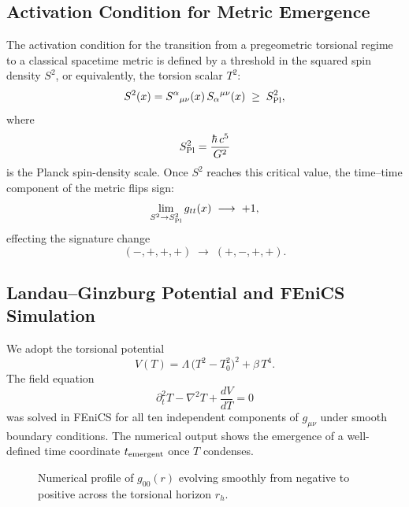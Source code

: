 \documentclass{article}
\begin{document}
\subsection{Activation Condition for Metric Emergence}
The activation condition for the transition from a pregeometric torsional regime to a classical spacetime metric is defined by a threshold in the squared spin density \(S^2\), or equivalently, the torsion scalar \(T^2\):
\[
  S^2(x) = S^\alpha{}_{\mu\nu}(x)\,S_\alpha{}^{\mu\nu}(x)
  \;\ge\; S_{\rm Pl}^2,
\]
where 
\[
  S_{\rm Pl}^2 = \frac{\hbar\,c^5}{G^2}
\]
is the Planck spin-density scale.  Once \(S^2\) reaches this critical value, the time–time component of the metric flips sign:
\[
  \lim_{S^2\to S_{\rm Pl}^2} g_{tt}(x)\;\longrightarrow\;+1,
\]
effecting the signature change
\[
  (-,+,+,+)\;\longrightarrow\;(+,-,+,+).
\]

\subsection{Landau–Ginzburg Potential and FEniCS Simulation}
We adopt the torsional potential
\[
  V(T) = \Lambda\,\bigl(T^2 - T_0^2\bigr)^2 + \beta\,T^4.
\]
The field equation
\[
  \partial_t^2 T - \nabla^2T + \frac{dV}{dT} = 0
\]
was solved in FEniCS for all ten independent components of \(g_{\mu\nu}\) under smooth boundary conditions.  The numerical output shows the emergence of a well-defined time coordinate \(t_{\rm emergent}\) once \(T\) condenses.

\begin{figure}[h]
  \centering
  \caption{Numerical profile of \(g_{00}(r)\) evolving smoothly from negative to positive across the torsional horizon \(r_h\).}
\end{figure}
\end{document}
